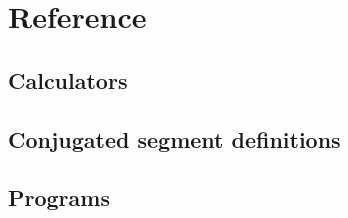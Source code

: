 \chapter{Reference}
\section{Calculators}


\section{Conjugated segment definitions}


\section{Programs}

